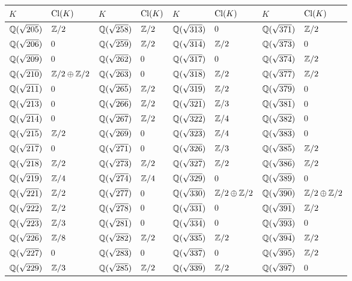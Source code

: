 \begin{center}
\renewcommand{\arraystretch}{1.5}
\begin{tabular}{x{1.5cm}x{1.5cm}x{1.5cm}x{1.5cm}x{1.5cm}x{1.5cm}x{1.5cm}x{1.5cm}}
\hline
$K$ & $\operatorname{Cl} (K)$ & $K$ & $\operatorname{Cl} (K)$ & $K$ & $\operatorname{Cl} (K)$ & $K$ & $\operatorname{Cl} (K)$ \tabularnewline\hline
$\mathbb{Q} (\sqrt{205})$ & $\mathbb{Z}/2$ & $\mathbb{Q} (\sqrt{258})$ & $\mathbb{Z}/2$ & $\mathbb{Q} (\sqrt{313})$ & $0$ & $\mathbb{Q} (\sqrt{371})$ & $\mathbb{Z}/2$ \tabularnewline\hline
$\mathbb{Q} (\sqrt{206})$ & $0$ & $\mathbb{Q} (\sqrt{259})$ & $\mathbb{Z}/2$ & $\mathbb{Q} (\sqrt{314})$ & $\mathbb{Z}/2$ & $\mathbb{Q} (\sqrt{373})$ & $0$ \tabularnewline\hline
$\mathbb{Q} (\sqrt{209})$ & $0$ & $\mathbb{Q} (\sqrt{262})$ & $0$ & $\mathbb{Q} (\sqrt{317})$ & $0$ & $\mathbb{Q} (\sqrt{374})$ & $\mathbb{Z}/2$ \tabularnewline\hline
$\mathbb{Q} (\sqrt{210})$ & $\mathbb{Z}/2\oplus\mathbb{Z}/2$ & $\mathbb{Q} (\sqrt{263})$ & $0$ & $\mathbb{Q} (\sqrt{318})$ & $\mathbb{Z}/2$ & $\mathbb{Q} (\sqrt{377})$ & $\mathbb{Z}/2$ \tabularnewline\hline
$\mathbb{Q} (\sqrt{211})$ & $0$ & $\mathbb{Q} (\sqrt{265})$ & $\mathbb{Z}/2$ & $\mathbb{Q} (\sqrt{319})$ & $\mathbb{Z}/2$ & $\mathbb{Q} (\sqrt{379})$ & $0$ \tabularnewline\hline
$\mathbb{Q} (\sqrt{213})$ & $0$ & $\mathbb{Q} (\sqrt{266})$ & $\mathbb{Z}/2$ & $\mathbb{Q} (\sqrt{321})$ & $\mathbb{Z}/3$ & $\mathbb{Q} (\sqrt{381})$ & $0$ \tabularnewline\hline
$\mathbb{Q} (\sqrt{214})$ & $0$ & $\mathbb{Q} (\sqrt{267})$ & $\mathbb{Z}/2$ & $\mathbb{Q} (\sqrt{322})$ & $\mathbb{Z}/4$ & $\mathbb{Q} (\sqrt{382})$ & $0$ \tabularnewline\hline
$\mathbb{Q} (\sqrt{215})$ & $\mathbb{Z}/2$ & $\mathbb{Q} (\sqrt{269})$ & $0$ & $\mathbb{Q} (\sqrt{323})$ & $\mathbb{Z}/4$ & $\mathbb{Q} (\sqrt{383})$ & $0$ \tabularnewline\hline
$\mathbb{Q} (\sqrt{217})$ & $0$ & $\mathbb{Q} (\sqrt{271})$ & $0$ & $\mathbb{Q} (\sqrt{326})$ & $\mathbb{Z}/3$ & $\mathbb{Q} (\sqrt{385})$ & $\mathbb{Z}/2$ \tabularnewline\hline
$\mathbb{Q} (\sqrt{218})$ & $\mathbb{Z}/2$ & $\mathbb{Q} (\sqrt{273})$ & $\mathbb{Z}/2$ & $\mathbb{Q} (\sqrt{327})$ & $\mathbb{Z}/2$ & $\mathbb{Q} (\sqrt{386})$ & $\mathbb{Z}/2$ \tabularnewline\hline
$\mathbb{Q} (\sqrt{219})$ & $\mathbb{Z}/4$ & $\mathbb{Q} (\sqrt{274})$ & $\mathbb{Z}/4$ & $\mathbb{Q} (\sqrt{329})$ & $0$ & $\mathbb{Q} (\sqrt{389})$ & $0$ \tabularnewline\hline
$\mathbb{Q} (\sqrt{221})$ & $\mathbb{Z}/2$ & $\mathbb{Q} (\sqrt{277})$ & $0$ & $\mathbb{Q} (\sqrt{330})$ & $\mathbb{Z}/2\oplus\mathbb{Z}/2$ & $\mathbb{Q} (\sqrt{390})$ & $\mathbb{Z}/2\oplus\mathbb{Z}/2$ \tabularnewline\hline
$\mathbb{Q} (\sqrt{222})$ & $\mathbb{Z}/2$ & $\mathbb{Q} (\sqrt{278})$ & $0$ & $\mathbb{Q} (\sqrt{331})$ & $0$ & $\mathbb{Q} (\sqrt{391})$ & $\mathbb{Z}/2$ \tabularnewline\hline
$\mathbb{Q} (\sqrt{223})$ & $\mathbb{Z}/3$ & $\mathbb{Q} (\sqrt{281})$ & $0$ & $\mathbb{Q} (\sqrt{334})$ & $0$ & $\mathbb{Q} (\sqrt{393})$ & $0$ \tabularnewline\hline
$\mathbb{Q} (\sqrt{226})$ & $\mathbb{Z}/8$ & $\mathbb{Q} (\sqrt{282})$ & $\mathbb{Z}/2$ & $\mathbb{Q} (\sqrt{335})$ & $\mathbb{Z}/2$ & $\mathbb{Q} (\sqrt{394})$ & $\mathbb{Z}/2$ \tabularnewline\hline
$\mathbb{Q} (\sqrt{227})$ & $0$ & $\mathbb{Q} (\sqrt{283})$ & $0$ & $\mathbb{Q} (\sqrt{337})$ & $0$ & $\mathbb{Q} (\sqrt{395})$ & $\mathbb{Z}/2$ \tabularnewline\hline
$\mathbb{Q} (\sqrt{229})$ & $\mathbb{Z}/3$ & $\mathbb{Q} (\sqrt{285})$ & $\mathbb{Z}/2$ & $\mathbb{Q} (\sqrt{339})$ & $\mathbb{Z}/2$ & $\mathbb{Q} (\sqrt{397})$ & $0$ \tabularnewline\hline

\end{tabular}
\end{center}
